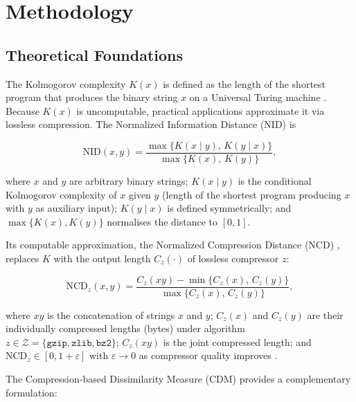 \section{Methodology}\label{sec:methods}

\subsection{Theoretical Foundations}\label{subsec:theory}

The Kolmogorov complexity $K(x)$ is defined as the length of the
shortest program that produces the binary string $x$ on a Universal
Turing machine \cite{li2004similarity}. Because $K(x)$ is uncomputable,
practical applications approximate it via lossless compression.
The Normalized Information Distance (NID) \cite{li2004similarity} is

\begin{equation}
  \mathrm{NID}(x,y)
  = \frac{\max\bigl\{K(x\mid y),\,K(y\mid x)\bigr\}}
         {\max\bigl\{K(x),\,K(y)\bigr\}},
  \label{eq:nid}
\end{equation}

\noindent where $x$ and $y$ are arbitrary binary strings;
$K(x \mid y)$ is the conditional Kolmogorov complexity of $x$
given $y$ (length of the shortest program producing $x$ with $y$
as auxiliary input); $K(y \mid x)$ is defined symmetrically; and
$\max\{K(x), K(y)\}$ normalises the distance to $[0,1]$.

Its computable approximation, the Normalized Compression Distance
(NCD) \cite{cilibrasi2005clustering}, replaces $K$ with the output length $C_z(\cdot)$
of lossless compressor $z$:

\begin{equation}
  \mathrm{NCD}_z(x,y)
  = \frac{C_z(xy) - \min\bigl\{C_z(x),\,C_z(y)\bigr\}}
         {\max\bigl\{C_z(x),\,C_z(y)\bigr\}},
  \label{eq:ncd}
\end{equation}

\noindent where $xy$ is the concatenation of strings $x$ and $y$;
$C_z(x)$ and $C_z(y)$ are their individually compressed lengths
(bytes) under algorithm $z \in \mathcal{Z} = \{\texttt{gzip},
\texttt{zlib}, \texttt{bz2}\}$; $C_z(xy)$ is the joint compressed
length; and $\mathrm{NCD}_z \in [0,1+\varepsilon]$ with
$\varepsilon \to 0$ as compressor quality improves \cite{cilibrasi2005clustering}.

The Compression-based Dissimilarity Measure (CDM) \cite{keogh2007compression}
provides a complementary formulation:

